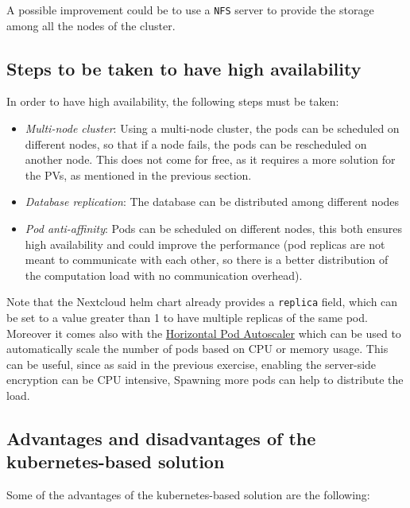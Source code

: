 A possible improvement could be to use a \texttt{NFS} server to provide the storage among all the nodes of the cluster. 


\subsection{Steps to be taken to have high availability}

In order to have high availability, the following steps must be taken:

\begin{itemize}
    \itemsep0em
    \item \textit{Multi-node cluster}: Using a multi-node cluster, the pods can be scheduled on different nodes, so that if a node fails, the pods can be rescheduled on another node. This does not come for free, as it requires a more solution for the PVs, as mentioned in the previous section.
    \item \textit{Database replication}: The database can be distributed among different nodes
    \item \textit{Pod anti-affinity}: Pods can be scheduled on different nodes, this both ensures high availability and could improve the performance (pod replicas are not meant to communicate with each other, so there is a better distribution of the computation load with no communication overhead).
\end{itemize}

Note that the Nextcloud helm chart already provides a \texttt{replica} field, which can be set to a value greater than 1 to have multiple replicas of the same pod. Moreover it comes also with the \href{https://kubernetes.io/docs/tasks/run-application/horizontal-pod-autoscale/}{Horizontal Pod Autoscaler} which can be used to automatically scale the number of pods based on CPU or memory usage. This can be useful, since as said in the previous exercise,
enabling the server-side encryption can be CPU intensive, Spawning more pods can help to distribute the load.


\subsection{Advantages and disadvantages of the kubernetes-based solution}

Some of the advantages of the kubernetes-based solution are the following:

